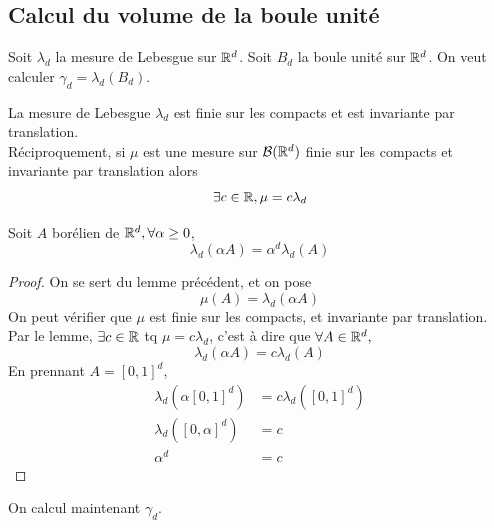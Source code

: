 \documentclass[]{report}
\begin{document}
\subsection{Calcul du volume de la boule unité}

Soit $\lambda_d$ la mesure de Lebesgue sur $\mathbb{R}^d$. Soit $B_d$ la boule unité sur $\mathbb{R}^d$. On veut calculer $\gamma_d=\lambda_d\left(B_d\right)$.

\begin{lm}{}{}
    La mesure de Lebesgue $\lambda_d$ est finie sur les compacts et est invariante par translation.\\
    Réciproquement, si $\mu$ est une mesure sur $\mathcal{B}(\mathbb{R}^d)$ finie sur les compacts et invariante par translation alors
    \[\exists c\in \mathbb{R},\mu=c\lambda_d\]
\end{lm}

\begin{lm}{}{}
    Soit $A$ borélien de $\mathbb{R}^d,\forall \alpha\ge 0$,
    \[\lambda_d (\alpha A)=\alpha^d \lambda_d(A)\]
\end{lm}

\begin{proof}{}{}
    On se sert du lemme précédent, et on pose
    \[\mu(A)=\lambda_d(\alpha A)\]
    On peut vérifier que $\mu$ est finie sur les compacts, et invariante par translation. Par le lemme, $\exists c\in \mathbb{R}$ tq $\mu=c\lambda_d$, c'est à dire que $\forall A\in \mathbb{R}^d,$
    \[\lambda_d(\alpha A)=c\lambda_d (A)\]
    En prennant $A=[0,1]^d$,
    \begin{align*}
        \lambda_d\left(\alpha[0,1]^d\right) & = c\lambda_d \left([0,1]^d\right) \\
        \lambda_d\left([0,\alpha]^d\right)  & =c                                \\
        \alpha^d                            & =c
    \end{align*}
\end{proof}

On calcul maintenant $\gamma_d$.
\end{document}
